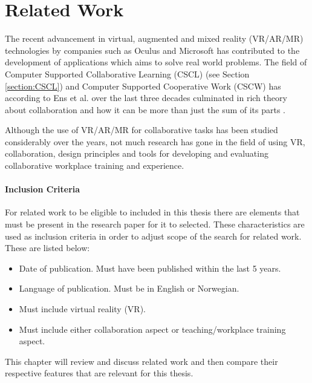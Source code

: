 
\chapter{Related Work}
\label{chap:relatedWork}
The recent advancement in virtual, augmented and mixed reality (VR/AR/MR) technologies by companies such as Oculus and Microsoft 
has contributed to the development of applications which aims to solve real world problems. The field of Computer Supported Collaborative Learning (CSCL) (see Section \ref{section:CSCL}) and Computer Supported Cooperative Work (CSCW) has according to Ens et al. over the last three decades culminated in rich theory about collaboration and how it can be more than just the sum of its parts \cite{ens2019revisiting}.

Although the use of VR/AR/MR for collaborative tasks has been studied considerably over the years, not much research has gone in the field of using VR, collaboration, design principles and tools for developing and evaluating collaborative workplace training and experience. 

\subsubsection{Inclusion Criteria}
\label{section:inclusionCriteria}
For related work to be eligible to included in this thesis there are elements that must be present in the research paper for it to selected. These characteristics are used as inclusion criteria in order to adjust scope of the search for related work. These are listed below:

\begin{itemize}
\label{itm:inclusionCriteria}
\setlength\itemsep{0em}
  \item Date of publication. Must have been published within the last 5 years.
  \item Language of publication. Must be in English or Norwegian.
  \item Must include virtual reality (VR).
  \item Must include either collaboration aspect or teaching/workplace training aspect.
\end{itemize}


This chapter will review and discuss related work and then compare their respective features that are relevant for this thesis. 





